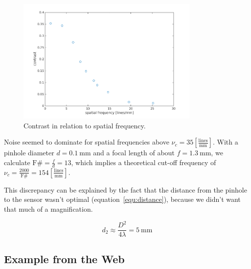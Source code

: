 \documentclass[a4paper, 12pt]{paper}
\begin{document}
\begin{figure}[H]
    \centering
    \includegraphics[width=0.8\textwidth]{img/contrast}
    \caption{Contrast in relation to spatial frequency.}
\label{fig:contrast}
\end{figure}


Noise seemed to dominate for spatial frequencies above $\nu_c = 35 \left[ \frac{\mbox{lines}}{\mbox{mm}} \right]$.
With a pinhole diameter $d = \SI{0.1}{\milli\meter}$ and a focal length of about $f = \SI{1.3}{\milli\meter}$, we calculate $\mbox{F\#} = \frac{f}{d} = 13$, which implies a theoretical cut-off frequency of $\nu_c = \frac{2000}{\mbox{F\#}} = 154 \left[ \frac{\mbox{lines}}{\mbox{mm}} \right]$. 

This discrepancy can be explained by the fact that the distance from the pinhole to the sensor wasn't optimal (equation~\ref{equ:distance}), because we didn't want that much of a magnification.

\begin{equation}
    d_2 \approx \frac{D^2}{4 \lambda} = \SI{5}{\milli\meter}
    \label{equ:distance}
\end{equation}

\subsection{Example from the Web}
\end{document}
